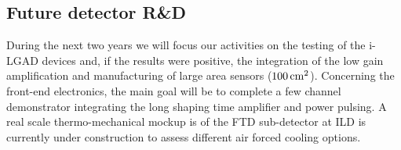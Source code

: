 \subsection{Future detector R\&D}
During the next two years we will focus our activities on the testing of the i-LGAD devices and, if the results were positive, the integration of the low gain amplification and manufacturing of large area sensors ($\unit[100]{cm^2}$). Concerning the front-end electronics, the main goal will be to complete a few channel demonstrator integrating the long shaping time amplifier and power pulsing. A real scale thermo-mechanical mockup is of the FTD sub-detector at ILD is currently under construction to assess different air forced cooling options.
